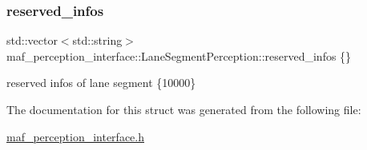 \subsubsection{\texorpdfstring{reserved\+\_\+infos}{reserved\_infos}}
{\footnotesize\ttfamily std\+::vector$<$std\+::string$>$ maf\+\_\+perception\+\_\+interface\+::\+Lane\+Segment\+Perception\+::reserved\+\_\+infos \{\}}



reserved infos of lane segment \{10000\} 



The documentation for this struct was generated from the following file\+:\begin{DoxyCompactItemize}
\item 
\hyperlink{maf__perception__interface_8h}{maf\+\_\+perception\+\_\+interface.\+h}\end{DoxyCompactItemize}
